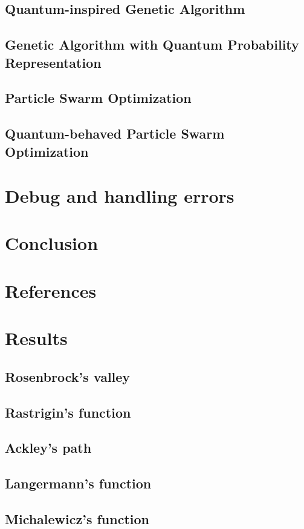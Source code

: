 \documentclass[a4paper,11pt,twocolumn]{article}
\begin{document}
\subsection{Quantum-inspired Genetic Algorithm}

\subsection{Genetic Algorithm with Quantum Probability Representation}

\subsection{Particle Swarm Optimization}

\subsection{Quantum-behaved Particle Swarm Optimization}

\section{Debug and handling errors}

\balance

\section{Conclusion}

\section{References}

\appendix

\section{Results}

\subsection{Rosenbrock's valley}

\subsection{Rastrigin's function}

\subsection{Ackley's path}

\subsection{Langermann's function}

\subsection{Michalewicz's function}
\end{document}
